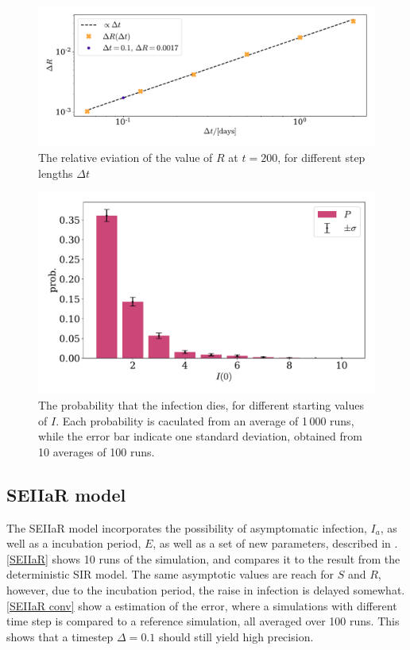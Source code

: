 \documentclass{article}
\begin{document}
    \begin{figure}[H]
        \centering
        \includegraphics[width=.7\textwidth]{../plots/2B/conv.pdf}
        \caption{The relative eviation of the value of $R$ at $t=200$, for different step lengths $\Delta t$}
        \label{conv}
    \end{figure}


    \begin{figure}[H]
        \centering
        \includegraphics[width=.7\textwidth]{../plots/2B/disappear.pdf}
        \caption{The probability that the infection dies, for different starting values of $I$. Each probability is caculated from an average of 1\,000 runs, while the error bar indicate one standard deviation, obtained from 10 averages of 100 runs.}
        \label{Disappear}
    \end{figure}

    \subsection*{SEIIaR model}
    The SEIIaR model incorporates the possibility of asymptomatic infection, $I_a$, as well as a incubation period, $E$, as well as a set of new parameters, described in \cite{exam}.
    \autoref{SEIIaR} shows 10 runs of the simulation, and compares it to the result from the deterministic SIR model.
    The same asymptotic values are reach for $S$ and $R$, however, due to the incubation period, the raise in infection is delayed somewhat.
    \autoref{SEIIaR conv} show a estimation of the error, where a simulations with different time step is compared to a reference simulation, all averaged over 100 runs.
    This shows that a timestep $\Delta = 0.1$ should still yield high precision.
\end{document}
